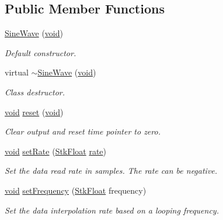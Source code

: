 \subsection*{Public Member Functions}
\begin{DoxyCompactItemize}
\item 
\hyperlink{class_nyq_1_1_sine_wave_aba4f47534a731e7bdf48e5d80ad59002}{Sine\+Wave} (\hyperlink{sound_8c_ae35f5844602719cf66324f4de2a658b3}{void})
\begin{DoxyCompactList}\small\item\em Default constructor. \end{DoxyCompactList}\item 
virtual \hyperlink{class_nyq_1_1_sine_wave_ac9b10c92d7e1733d3535a4b58c95d2bf}{$\sim$\+Sine\+Wave} (\hyperlink{sound_8c_ae35f5844602719cf66324f4de2a658b3}{void})
\begin{DoxyCompactList}\small\item\em Class destructor. \end{DoxyCompactList}\item 
\hyperlink{sound_8c_ae35f5844602719cf66324f4de2a658b3}{void} \hyperlink{class_nyq_1_1_sine_wave_a97fb5a5e393cf3ab2bd9e645533851f0}{reset} (\hyperlink{sound_8c_ae35f5844602719cf66324f4de2a658b3}{void})
\begin{DoxyCompactList}\small\item\em Clear output and reset time pointer to zero. \end{DoxyCompactList}\item 
\hyperlink{sound_8c_ae35f5844602719cf66324f4de2a658b3}{void} \hyperlink{class_nyq_1_1_sine_wave_a62020c113a8235584ce4ff414cac0a07}{set\+Rate} (\hyperlink{namespace_nyq_a044fa20a706520a617bbbf458a7db7e4}{Stk\+Float} \hyperlink{seqread_8c_ad89d3fac2deab7a9cf6cfc8d15341b85}{rate})
\begin{DoxyCompactList}\small\item\em Set the data read rate in samples. The rate can be negative. \end{DoxyCompactList}\item 
\hyperlink{sound_8c_ae35f5844602719cf66324f4de2a658b3}{void} \hyperlink{class_nyq_1_1_sine_wave_a038e53f5ce400b9d559c1899dc21ccee}{set\+Frequency} (\hyperlink{namespace_nyq_a044fa20a706520a617bbbf458a7db7e4}{Stk\+Float} frequency)
\begin{DoxyCompactList}\small\item\em Set the data interpolation rate based on a looping frequency. \end{DoxyCompactList}\item 

\end{DoxyCompactItemize}

